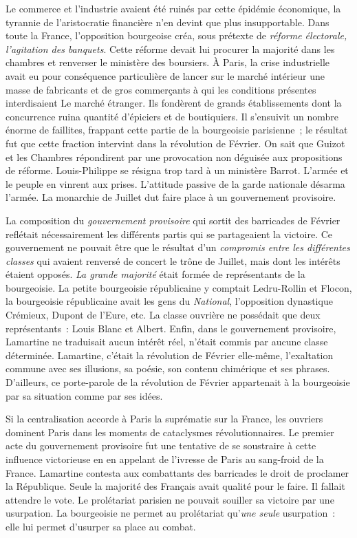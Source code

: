 \documentclass[french,twoside]{book} %
\begin{document}
Le commerce et l’industrie avaient été ruinés par cette épidémie économique, la tyrannie de l’aristocratie financière n’en devint que plus insupportable. Dans toute la France, l’opposition bourgeoise créa, sous prétexte de \emph{réforme électorale, l’agitation des banquets}. Cette réforme devait lui procurer la majorité dans les chambres et renverser le ministère des boursiers. À Paris, la crise industrielle avait eu pour conséquence particulière de lancer sur le marché intérieur une masse de fabricants et de gros commerçants à qui les conditions présentes interdisaient Le marché étranger. Ils fondèrent de grands établissements dont la concurrence ruina quantité d’épiciers et de boutiquiers. Il s’ensuivit un nombre énorme de faillites, frappant cette partie de la bourgeoisie parisienne ; le résultat fut que cette fraction intervint dans la révolution de Février. On sait que Guizot et les Chambres répondirent par une provocation non déguisée aux propositions de réforme. Louis-Philippe se résigna trop tard à un ministère Barrot. L’armée et le peuple en vinrent aux prises. L’attitude passive de la garde nationale désarma l’armée. La monarchie de Juillet dut faire place à un gouvernement provisoire.\par
La composition du \emph{gouvernement provisoire} qui sortit des barricades de Février reflétait nécessairement les différents partis qui se partageaient la victoire. Ce gouvernement ne pouvait être que le résultat d’un \emph{compromis entre les différentes classes} qui avaient renversé de concert le trône de Juillet, mais dont les intérêts étaient opposés. \emph{La grande majorité} était formée de représentants de la bourgeoisie. La petite bourgeoisie républicaine y comptait Ledru-Rollin et Flocon, la bourgeoisie républicaine avait les gens du \emph{National}, l’opposition dynastique Crémieux, Dupont de l’Eure, etc. La classe ouvrière ne possédait que deux représentants : Louis Blanc et Albert. Enfin, dans le gouvernement provisoire, Lamartine ne traduisait aucun intérêt réel, n’était commis par aucune classe déterminée. Lamartine, c’était la révolution de Février elle-même, l’exaltation commune avec ses illusions, sa poésie, son contenu chimérique et ses phrases. D’ailleurs, ce porte-parole de la révolution de Février appartenait à la bourgeoisie par sa situation comme par ses idées.\par
Si la centralisation accorde à Paris la suprématie sur la France, les ouvriers dominent Paris dans les moments de cataclysmes révolutionnaires. Le premier acte du gouvernement provisoire fut une tentative de se soustraire à cette influence victorieuse en en appelant de l’ivresse de Paris au sang-froid de la France. Lamartine contesta aux combattants des barricades le droit de proclamer la République. Seule la majorité des Français avait qualité pour le faire. Il fallait attendre le vote. Le prolétariat parisien ne pouvait souiller sa victoire par une usurpation. La bourgeoisie ne permet au prolétariat qu’\emph{une seule} usurpation : elle lui permet d’usurper sa place au combat.\par
\end{document}
